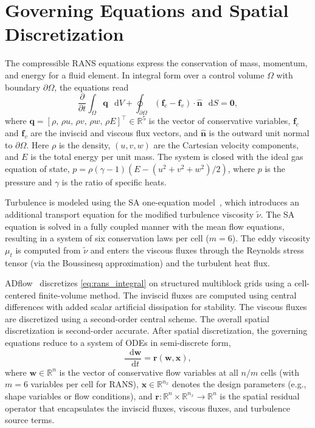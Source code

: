 \documentclass[journal]{new-aiaa}
\newcommand{\f}[2]{\frac{#1}{#2}}
\newcommand{\mb}[1]{\mathbf{#1}}
\renewcommand{\d}{\mathop{}\!\mathrm{d}} %
\newcommand{\p}{\partial}
\begin{document}
\section{Governing Equations and Spatial Discretization}\label{sec:governing}
The compressible RANS equations express the conservation of mass, momentum, and energy for a fluid element.
In integral form over a control volume $\Omega$ with boundary $\p \Omega$, the equations read
\begin{equation}\label{eq:rans_integral}
\f{\p}{\p t} \int_{\Omega} \mb{q} \, \d V + \oint_{\p \Omega} \left( \mb{f}_c - \mb{f}_v \right) \cdot \hat{\mb{n}} \, \d S = \mb{0},
\end{equation}
where $\mb{q} = [\rho, \, \rho u, \, \rho v, \, \rho w, \, \rho E]^\intercal \in \mathbb{R}^5$ is the vector of conservative variables, $\mb{f}_c$ and $\mb{f}_v$ are the inviscid and viscous flux vectors, and $\hat{\mb{n}}$ is the outward unit normal to $\p \Omega$.
Here $\rho$ is the density, $(u, v, w)$ are the Cartesian velocity components, and $E$ is the total energy per unit mass.
The system is closed with the ideal gas equation of state, $p = \rho (\gamma - 1)(E - (u^2 + v^2 + w^2)/2)$, where $p$ is the pressure and $\gamma$ is the ratio of specific heats.

Turbulence is modeled using the SA one-equation model~\cite{Spalart1992}, which introduces an additional transport equation for the modified turbulence viscosity $\tilde{\nu}$.
The SA equation is solved in a fully coupled manner with the mean flow equations, resulting in a system of six conservation laws per cell ($m = 6$).
The eddy viscosity $\mu_t$ is computed from $\tilde{\nu}$ and enters the viscous fluxes through the Reynolds stress tensor (via the Boussinesq approximation) and the turbulent heat flux.

ADflow~\cite{ADflow2020} discretizes \cref{eq:rans_integral} on structured multiblock grids using a cell-centered finite-volume method.
The inviscid fluxes are computed using central differences with added scalar artificial dissipation for stability.
The viscous fluxes are discretized using a second-order central scheme.
The overall spatial discretization is second-order accurate.
After spatial discretization, the governing equations reduce to a system of ODEs in semi-discrete form,
\begin{equation}\label{eq:semi_discrete}
\f{\d \mb{w}}{\d t} = \mb{r}(\mb{w}, \mb{x}),
\end{equation}
where $\mb{w} \in \mathbb{R}^n$ is the vector of conservative flow variables at all $n/m$ cells (with $m = 6$ variables per cell for RANS), $\mb{x} \in \mathbb{R}^{n_x}$ denotes the design parameters (e.g., shape variables or flow conditions), and $\mb{r}: \mathbb{R}^n \times \mathbb{R}^{n_x} \to \mathbb{R}^n$ is the spatial residual operator that encapsulates the inviscid fluxes, viscous fluxes, and turbulence source terms.
\end{document}
